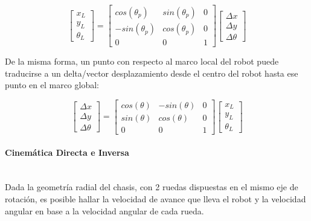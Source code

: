 \begin{equation}	
	\begin{bmatrix}
		x_L \\
		y_L \\
		\theta_L 
	\end{bmatrix}
	=
	\begin{bmatrix}
		cos(\theta_p) & sin(\theta_p) & 0\\
		-sin(\theta_p) & cos(\theta_p) & 0\\
		0 & 0 & 1
	\end{bmatrix}
	\begin{bmatrix}
		\Delta x \\
		\Delta y \\
		\Delta \theta
	\end{bmatrix}
\end{equation}

De la misma forma, un punto con respecto al marco local del robot puede traducirse a un delta/vector desplazamiento desde el centro del robot hasta ese punto en el marco global:

\begin{equation}	
	\begin{bmatrix}
		\Delta x \\
		\Delta y \\
		\Delta \theta
	\end{bmatrix}
	=
	\begin{bmatrix}
		cos(\theta) & -sin(\theta) & 0\\
		sin(\theta) & cos(\theta) & 0 \\
		0 & 0 & 1
	\end{bmatrix}
	\begin{bmatrix}
		x_L \\
		y_L \\
		\theta_L
	\end{bmatrix}
\end{equation}


\paragraph{Cinemática Directa e Inversa}~\\
Dada la geometría radial del chasis, con 2 ruedas dispuestas en el mismo eje de rotación, es posible hallar la velocidad de avance que lleva el robot y la velocidad angular en base a la velocidad angular de cada rueda.

